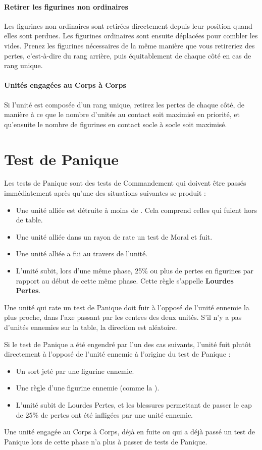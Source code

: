 \paragraph{Retirer les figurines non ordinaires}

Les figurines non ordinaires sont retirées directement depuis leur position quand elles sont perdues. Les figurines ordinaires sont ensuite déplacées pour combler les vides. Prenez les figurines nécessaires de la même manière que vous retireriez des pertes, c'est-à-dire du rang arrière, puis équitablement de chaque côté en cas de rang unique.

\paragraph{Unités engagées au Corps à Corps}

Si l'unité est composée d'un rang unique, retirez les pertes de chaque côté, de manière à ce que le nombre d'unités au contact soit maximisé en priorité, et qu'ensuite le nombre de figurines en contact socle à socle soit maximisé.

\hypertarget{panictest}{\section{Test de Panique}}

Les tests de Panique sont des tests de Commandement qui doivent être passés immédiatement après qu'une des situations suivantes se produit :
\begin{itemize}[label={-}]
\item Une unité alliée est détruite à moins de . Cela comprend celles qui fuient hors de table.
\item Une unité alliée dans un rayon de  rate un test de Moral et fuit.
\item Une unité alliée a fui au travers de l'unité.
\item L'unité subit, lors d'une même phase, 25\% ou plus de pertes en figurines par rapport au début de cette même phase. Cette règle s'appelle \textbf{Lourdes Pertes}.
\end{itemize}

Une unité qui rate un test de Panique doit fuir à l'opposé de l'unité ennemie la plus proche, dans l'axe passant par les centres des deux unités. S'il n'y a pas d'unités ennemies sur la table, la direction est aléatoire.

Si le test de Panique a été engendré par l'un des cas suivants, l'unité fuit plutôt directement à l'opposé de l'unité ennemie à l'origine du test de Panique :
\begin{itemize}[label={-}]
\item Un sort jeté par une figurine ennemie.
\item Une règle d'une figurine ennemie (comme la \terror{}).
\item L'unité subit de Lourdes Pertes, et les blessures permettant de passer le cap de 25\% de pertes ont été infligées par une unité ennemie.
\end{itemize}

Une unité engagée au Corps à Corps, déjà en fuite ou qui a déjà passé un test de Panique lors de cette phase n'a plus à passer de tests de Panique.
